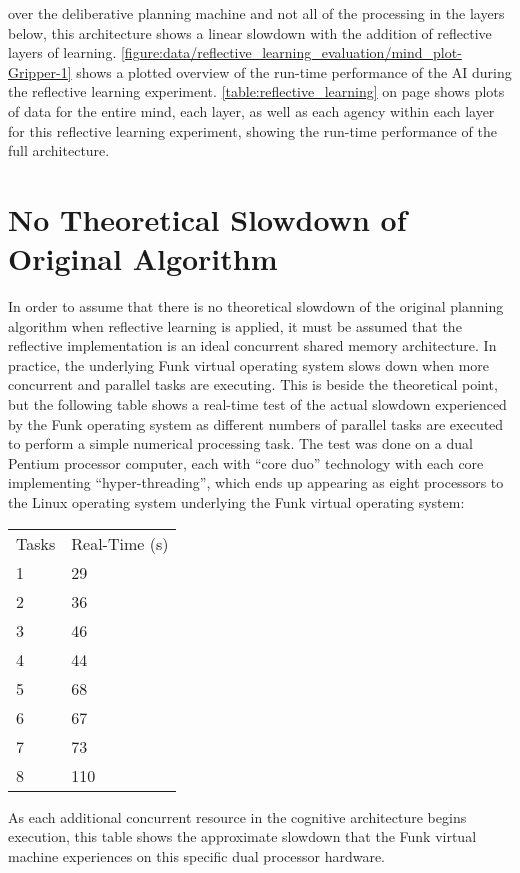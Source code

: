 over the deliberative planning machine and not all of the processing
in the layers below, this architecture shows a linear slowdown with
the addition of reflective layers of learning.
{\mbox{\autoref{figure:data/reflective_learning_evaluation/mind_plot-Gripper-1}}}
shows a plotted overview of the run-time performance of the AI during
the reflective learning experiment.
\autoref{table:reflective_learning} on page
\pageref{table:reflective_learning} shows plots of data for the entire
mind, each layer, as well as each agency within each layer for this
reflective learning experiment, showing the run-time performance of
the full architecture.

\section{No Theoretical Slowdown of Original Algorithm}

In order to assume that there is no theoretical slowdown of the
original planning algorithm when reflective learning is applied, it
must be assumed that the reflective implementation is an ideal
concurrent shared memory architecture.  In practice, the underlying
Funk virtual operating system slows down when more concurrent and
parallel tasks are executing.  This is beside the theoretical point,
but the following table shows a real-time test of the actual slowdown
experienced by the Funk operating system as different numbers of
parallel tasks are executed to perform a simple numerical processing
task.  The test was done on a dual Pentium processor computer, each
with ``core duo'' technology with each core implementing
``hyper-threading'', which ends up appearing as eight processors to
the Linux operating system underlying the Funk virtual operating
system:

\vspace{5mm}
\begin{tabular}{ll}
Tasks & Real-Time (s) \\
1 & 29\\
2 & 36\\
3 & 46\\
4 & 44\\
5 & 68\\
6 & 67\\
7 & 73\\
8 & 110\\
\end{tabular}
\vspace{5mm}

As each additional concurrent resource in the cognitive architecture
begins execution, this table shows the approximate slowdown that the
Funk virtual machine experiences on this specific dual processor
hardware.

